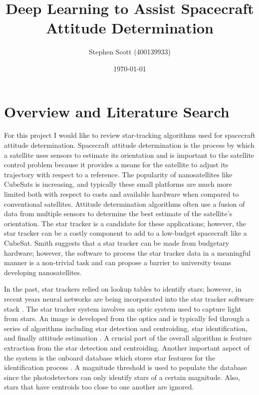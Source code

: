 \documentclass[a4paper]{article}
\title{Deep Learning to Assist Spacecraft Attitude Determination}
\author{
Stephen Scott (400139933)}
\date{\today}
\begin{document}
\maketitle

\section{Overview and Literature Search}

For this project I would like to review star-tracking algorithms used for spacecraft attitude determination. Spacecraft attitude determination is the process by which a satellite uses sensors to estimate its orientation and is important to the satellite control problem because it provides a means for the satellite to adjust its trajectory with respect to a reference\cite{adcs}. The popularity of nanosatellites like CubeSats is increasing, and typically these small platforms are much more limited both with respect to costs and available hardware when compared to conventional satellites. Attitude determination algorithms often use a fusion of data from multiple sensors to determine the best estimate of the satellite's orientation. The star tracker is a candidate for these applications; however, the star tracker can be a costly component to add to a low-budget spacecraft like a CubeSat\cite{starTrackAttDet}. Smith suggests that a star tracker can be made from budgetary hardware; however, the software to process the star tracker data in a meaningful manner is a non-trivial task and can propose a barrier to university teams developing nanosatellites. 

In the past, star trackers relied on lookup tables to identify stars; however, in recent years neural networks are being incorporated into the star tracker software stack \cite{lowCost}. The star tracker system involves an optic system used to capture light from stars. An image is developed from the optics and is typically fed through a series of algorithms including star detection and centroiding, star identification, and finally attitude estimation \cite{survey}. A crucial part of the overall algorithm is feature extraction from the star detection and centroiding. Another important aspect of the system is the onboard database which stores star features for the identification process \cite{survey}. A magnitude threshold is used to populate the database since the photodetectors can only identify stars of a certain magnitude. Also, stars that have centroids too close to one another are ignored.
\end{document}
